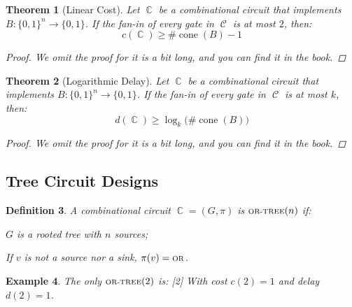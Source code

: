 \documentclass[12pt]{article}
\newcommand{\scr}[1]{{\scriptstyle\textup{#1}}}
\DeclareMathOperator{\C}{\mathcal{C}}
\DeclareMathOperator{\Circ}{\mathbb{C}}
\DeclareMathOperator{\OR}{\scr{OR}}
\newcommand*{\B}{\{0,1\}}
\DeclareMathOperator{\cone}{cone}
\newtheorem{theorem}{Theorem}[subsection]
\newtheorem{definition}[theorem]{Definition}
\newtheorem{example}[theorem]{Example}
\begin{document}
\begin{theorem}[Linear Cost]
  \label{lin_cost}
  Let $\Circ$ be a combinational circuit that implements $B:\B^n\to\B$. If the fan-in of every gate in $\C$ is at most $2$, then: $$c(\Circ)\geq \#\cone(B)-1$$
  \begin{proof}
    We omit the proof for it is a bit long, and you can find it in the book.
  \end{proof}
\end{theorem}

\begin{theorem}[Logarithmic Delay]
  \label{log_delay}
  Let $\Circ$ be a combinational circuit that implements $B:\B^n\to\B$. If the fan-in of every gate in $\C$ is at most $k$, then: $$d(\Circ)\geq \log_k\Big(\#\cone(B)\Big)$$
  \begin{proof}
    We omit the proof for it is a bit long, and you can find it in the book.
  \end{proof}
\end{theorem}

\pagebreak

\subsection{Tree Circuit Designs}

\begin{definition}
  A combinational circuit $\Circ=(G,\pi)$ is $\scr{OR-TREE}(n)$ if:
  \begin{compactenum}[(i)]
    \item $G$ is a rooted tree with $n$ sources;
    \item If $v$ is not a source nor a sink, $\pi(v)=\OR$.
  \end{compactenum}
\end{definition}

\begin{example}
  The only $\scr{OR-TREE}(2)$ is:
  [2]
  \noindent With cost $c(2)=1$ and delay $d(2)=1$.
\end{example}
\end{document}
